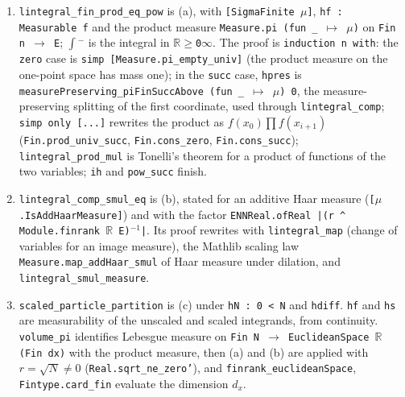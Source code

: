\documentclass[11pt,a4paper]{report}
\begin{document}
\begin{leanbox}
\begin{enumerate}
\item \texttt{lintegral\_\allowbreak{}fin\_\allowbreak{}prod\_\allowbreak{}eq\_\allowbreak{}pow} is (a), with \texttt{[Sigma\allowbreak{}Finite \ensuremath{\mu}]}, \texttt{hf : Measurable f} and the product measure \texttt{Measure.\allowbreak{}pi (fun \_\allowbreak{} \ensuremath{\mapsto} \ensuremath{\mu})} on \texttt{Fin n \ensuremath{\to} E}; \texttt{\ensuremath{\int}\ensuremath{{}^{-}}} is the integral in \texttt{\ensuremath{\mathbb R}\ensuremath{\ge}0\ensuremath{\infty}}. The proof is \texttt{induction n with}: the \texttt{zero} case is \texttt{simp [Measure.\allowbreak{}pi\_\allowbreak{}empty\_\allowbreak{}univ]} (the product measure on the one-point space has mass one); in the \texttt{succ} case, \texttt{hpres} is \texttt{measure\allowbreak{}Preserving\_\allowbreak{}pi\allowbreak{}Fin\allowbreak{}Succ\allowbreak{}Above (fun \_\allowbreak{} \ensuremath{\mapsto} \ensuremath{\mu}) 0}, the measure-preserving splitting of the first coordinate, used through \texttt{lintegral\_\allowbreak{}comp}; \texttt{simp only [.\allowbreak{}.\allowbreak{}.\allowbreak{}]} rewrites the product as \(f(x_0)\prod f(x_{i+1})\) (\texttt{Fin.\allowbreak{}prod\_\allowbreak{}univ\_\allowbreak{}succ}, \texttt{Fin.\allowbreak{}cons\_\allowbreak{}zero}, \texttt{Fin.\allowbreak{}cons\_\allowbreak{}succ}); \texttt{lintegral\_\allowbreak{}prod\_\allowbreak{}mul} is Tonelli's theorem for a product of functions of the two variables; \texttt{ih} and \texttt{pow\_\allowbreak{}succ} finish.

\item \texttt{lintegral\_\allowbreak{}comp\_\allowbreak{}smul\_\allowbreak{}eq} is (b), stated for an additive Haar measure (\texttt{[\ensuremath{\mu}.\allowbreak{}Is\allowbreak{}Add\allowbreak{}Haar\allowbreak{}Measure]}) and with the factor \texttt{ENNReal.\allowbreak{}of\allowbreak{}Real |(r \textasciicircum{} Module.\allowbreak{}finrank \ensuremath{\mathbb R} E)\ensuremath{{}^{-1}}|}. Its proof rewrites with \texttt{lintegral\_\allowbreak{}map} (change of variables for an image measure), the Mathlib scaling law \texttt{Measure.\allowbreak{}map\_\allowbreak{}add\allowbreak{}Haar\_\allowbreak{}smul} of Haar measure under dilation, and \texttt{lintegral\_\allowbreak{}smul\_\allowbreak{}measure}.

\item \texttt{scaled\_\allowbreak{}particle\_\allowbreak{}partition} is (c) under \texttt{h\allowbreak{}N : 0 < N} and \texttt{hdiff}. \texttt{hf} and \texttt{hs} are measurability of the unscaled and scaled integrands, from continuity. \texttt{volume\_\allowbreak{}pi} identifies Lebesgue measure on \texttt{Fin N \ensuremath{\to} Euclidean\allowbreak{}Space \ensuremath{\mathbb R} (Fin dx)} with the product measure, then (a) and (b) are applied with \(r=\sqrt N\ne0\) (\texttt{Real.\allowbreak{}sqrt\_\allowbreak{}ne\_\allowbreak{}zero'}), and \texttt{finrank\_\allowbreak{}euclidean\allowbreak{}Space}, \texttt{Fintype.\allowbreak{}card\_\allowbreak{}fin} evaluate the dimension \(d_x\).

\end{enumerate}
\end{leanbox}
\end{document}
